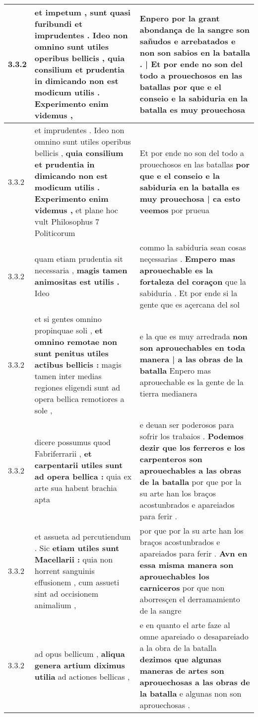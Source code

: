 \begin{tabular}{|p{1cm}|p{6.5cm}|p{6.5cm}|}
3.3.2 & et impetum , sunt quasi furibundi \textbf{ et imprudentes . Ideo non omnino sunt utiles operibus bellicis , } quia consilium et prudentia in dimicando non est modicum utilis . Experimento enim videmus , & Enpero por la grant abondança de la sangre son sañudos e arrebatados \textbf{ e non son sabios en la batalla . | Et por ende no son del todo a prouechosos en las batallas } por que e el conseio e la sabiduria en la batalla es muy prouechosa \\\hline
3.3.2 & et imprudentes . Ideo non omnino sunt utiles operibus bellicis , \textbf{ quia consilium et prudentia in dimicando non est modicum utilis . Experimento enim videmus , } et plane hoc vult Philosophus 7 Politicorum & Et por ende no son del todo a prouechosos en las batallas \textbf{ por que e el conseio e la sabiduria en la batalla es muy prouechosa | ca esto veemos } por prueua \\\hline
3.3.2 & quam etiam prudentia sit necessaria , \textbf{ magis tamen animositas est utilis . } Ideo & commo la sabiduria sean cosas neçessarias . \textbf{ Empero mas aprouechable es la fortaleza del coraçon } que la sabiduria . Et por ende si la gente que es açercana del sol \\\hline
3.3.2 & et si gentes omnino propinquae soli , \textbf{ et omnino remotae non sunt penitus utiles actibus bellicis : } magis tamen inter medias regiones eligendi sunt ad opera bellica remotiores a sole , & e la que es muy arredrada \textbf{ non son aprouechables en toda manera | a las obras de la batalla } Enpero mas aprouechable es la gente de la tierra medianera \\\hline
3.3.2 & dicere possumus quod Fabriferrarii , \textbf{ et carpentarii utiles sunt ad opera bellica : } quia ex arte sua habent brachia apta & e deuan ser poderosos para sofrir los trabaios . \textbf{ Podemos dezir que los ferreros e los carpenteros son aprouechables a las obras de la batalla } por que por la su arte han los braços acostunbrados e apareiados para ferir . \\\hline
3.3.2 & et assueta ad percutiendum . Sic \textbf{ etiam utiles sunt Macellarii : } quia non horrent sanguinis effusionem , cum assueti sint ad occisionem animalium , & por que por la su arte han los braços acostunbrados e apareiados para ferir . \textbf{ Avn en essa misma manera son aprouechables los carniceros } por que non aborresçen el derramamiento de la sangre \\\hline
3.3.2 & ad opus bellicum , \textbf{ aliqua genera artium diximus utilia } ad actiones bellicas , & e en quanto el arte faze al omne apareiado o desapareiado a la obra de la batalla \textbf{ dezimos que algunas maneras de artes son aprouechosas a las obras de la batalla } e algunas non son aprouechosas . \\\hline

\end{tabular}
